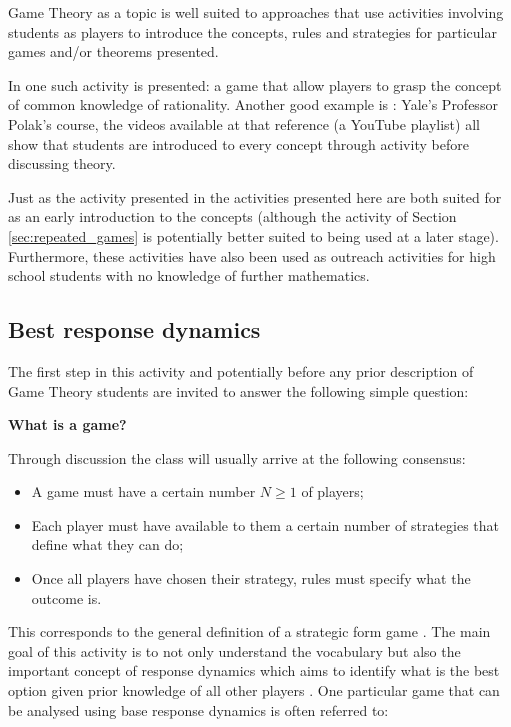 \documentclass{article}
\begin{document}
Game Theory as a topic is well suited to approaches that use activities
involving students as players to introduce the concepts, rules and strategies
for particular games and/or theorems presented.

In \cite{Brokaw2004} one such activity is presented: a game that allow players
to grasp the concept of common knowledge of rationality. Another good example is
\cite{Polak2008}: Yale's Professor Polak's course, the videos available at that
reference (a YouTube playlist) all show that students are introduced to every
concept through activity before discussing theory.

Just as the activity presented in \cite{Brokaw2004} the activities presented
here are both suited for as an early introduction to the concepts (although the
activity of Section \ref{sec:repeated_games} is potentially better suited to
being used at a later stage). Furthermore, these activities have also been used
as outreach activities for high school students with no knowledge of further
mathematics.

\subsection{Best response dynamics}\label{sec:best_responses}

The first step in this activity and potentially before any prior description of
Game Theory students are invited to answer the following simple question:

\begin{center}
    \textbf{What is a game?}
\end{center}

Through discussion the class will usually arrive at the following consensus:

\begin{itemize}
    \item A game must have a certain number \(N\geq 1\) of players;
    \item Each player must have available to them a certain number of strategies
        that define what they can do;
    \item Once all players have chosen their strategy, rules must specify what
        the outcome is.
\end{itemize}

This corresponds to the general definition of a strategic form game
\cite{Maschler2013}. The main goal of this activity is to not only understand
the vocabulary but also the important concept of response dynamics which aims
to identify what is the best option given prior knowledge of all other players
\cite{Maschler2013}. One particular game that can be analysed using base
response dynamics is often referred to:
\end{document}
